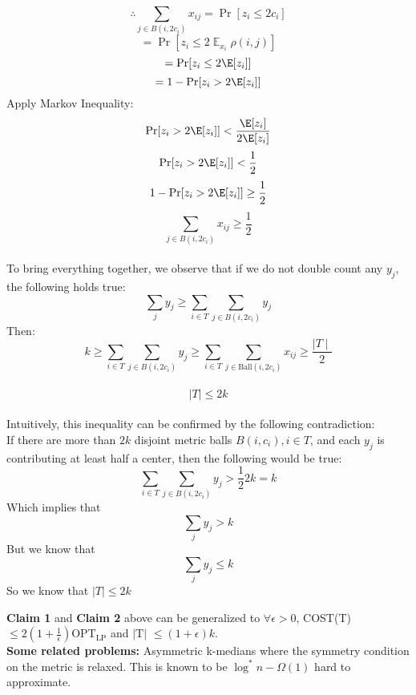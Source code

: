 \noindent $$ \therefore \sum\limits_{j \in B(i, 2c_i)}x_{ij} = \Pr [z_i \leq 2c_i] $$
$$ = \Pr [z_i \leq 2\displaystyle \mathop{\mathbb{E}}_{x_i}\rho(i,j)] $$
$$ = \Pr [z_i \leq 2\E[z_i]] $$
$$ = 1 - \Pr [z_i > 2\E[z_i]] $$ 
Apply Markov Inequality: \\

\noindent $$ \Pr [z_i> 2\E[z_i]] < \frac{\E[z_i]}{2\E[z_i]}  $$ 
$$ \Pr [z_i> 2\E[z_i]] < \frac{1}{2} $$
$$ 1 - \Pr [z_i > 2\E[z_i]] \geq \frac{1}{2} $$ 
$$ \sum\limits_{j \in B(i, 2c_i)}x_{ij} \geq \frac{1}{2} $$ \\
To bring everything together, we observe that if we do not double count any $y_j$, the following holds true: 
$$ \sum\limits_{j}y_j \geq \sum\limits_{i \in T}\sum\limits_{j \in B(i, 2c_i)}y_j $$ 
Then: 
$$k \geq \sum\limits_{i \in T}\sum\limits_{j \in B(i, 2c_i)}y_j \geq \sum\limits_{i \in T}\sum_{j \in \text{Ball}(i, 2c_i)}x_{ij} \geq \frac{\mid T \mid}{2}$$ \\
$$\mid T \mid \leq 2k$$\\
\noindent Intuitively, this inequality can be confirmed by the following contradiction: \\
If there are more than $2k$ disjoint metric balls $B(i, c_i), i \in T$, and each $y_j$ is contributing at least half a center, then the following would be true: \\
$$\sum\limits_{i \in T}\sum\limits_{j \in B(i, 2c_i)}y_j > \frac{1}{2}2k = k$$
Which implies that 
$$\sum\limits_{j}y_j > k$$
But we know that $$\sum\limits_{j}y_j \leq k$$
So we know that $\mid T \mid \leq 2k$

\noindent \textbf{Claim 1} and \textbf{Claim 2} above can be generalized to $\forall \epsilon > 0$, COST(T)$\leq2(1+\frac{1}{\epsilon})$OPT$_\text{LP}$ and $\mid $T$\mid$ $\leq (1+\epsilon)k$. \\

\noindent\textbf{Some related problems:} Asymmetric k-medians where the symmetry condition on the metric is relaxed. This is known to be $\log^*n - \Omega(1)$ hard to approximate. \\
